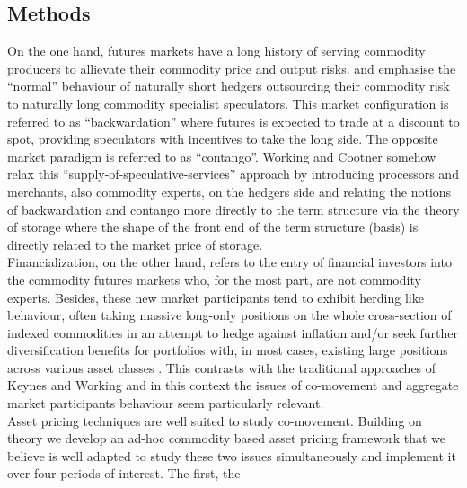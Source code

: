 \documentclass[12pt,]{article}
\begin{document}
\hypertarget{methods}{%
\subsection{Methods}\label{methods}}

On the one hand, futures markets have a long history of serving
commodity producers to allievate their commodity price and output risks.
\citet{keynes_treatise_1930} and \citet{hicks_value_1939} emphasise the
``normal'' behaviour of naturally short hedgers outsourcing their
commodity risk to naturally long commodity specialist speculators. This
market configuration is referred to as ``backwardation'' where futures
is expected to trade at a discount to spot, providing speculators with
incentives to take the long side. The opposite market paradigm is
referred to as ``contango''. Working
\citep{working_theory_1948, working_hedging_1953} and Cootner
\citep{cootner_returns_1960, CootnerSpeculationhedging1967} somehow
relax this ``supply-of-speculative-services''
\citep{Tilllongtermperspectivecommodity2007} approach by introducing
processors and merchants, also commodity experts, on the hedgers side
and relating the notions of backwardation and contango more directly to
the term structure via the theory of storage where the shape of the
front end of the term structure (basis) is directly related to the
market price of storage.\\
Financialization, on the other hand, refers to the entry of financial
investors into the commodity futures markets who, for the most part, are
not commodity experts. Besides, these new market participants tend to
exhibit herding like behaviour, often taking massive long-only positions
on the whole cross-section of indexed commodities in an attempt to hedge
against inflation and/or seek further diversification benefits for
portfolios with, in most cases, existing large positions across various
asset classes
\citep{brunetti_speculators_2016, boyd_prevalence_2016, cheng_convective_2014, juvenal_speculation_2015, singleton_investor_2013, tang_index_2012}.
This contrasts with the traditional approaches of Keynes and Working and
in this context the issues of co-movement and aggregate market
participants behaviour seem particularly relevant.\\
Asset pricing techniques are well suited to study co-movement. Building
on theory we develop an ad-hoc commodity based asset pricing framework
that we believe is well adapted to study these two issues simultaneously
and implement it over four periods of interest. The first, the
\end{document}
